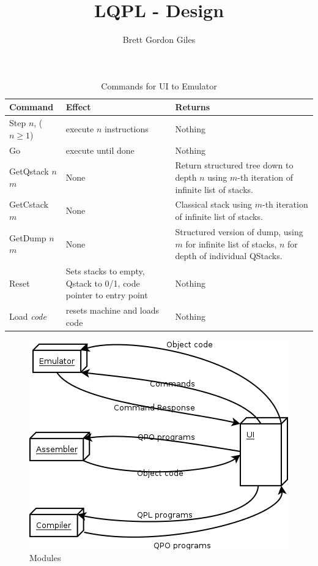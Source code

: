 \documentclass[12pt,letterpaper]{article}
\title{LQPL - Design}
\author{Brett Gordon Giles}
\begin{document}
\begin{table}[htdp]
\caption{Commands for UI to Emulator}
\begin{center}
\begin{tabular}{|p{1.5in}|p{2.1in}|p{2.1in}|}
\hline
Command&Effect &Returns \\ \hline
Step $n$, ($n\ge 1$) & execute $n$ instructions& Nothing \\ \hline
Go & execute until done &Nothing\\ \hline
GetQstack $n$ $m$ & None & Return structured tree down to depth $n$ using $m$-th iteration of infinite list of stacks.\\ \hline
GetCstack $m$ & None &Classical stack using $m$-th iteration of infinite list of stacks. \\ \hline
GetDump $n$ $m$ & None & Structured version of dump, using $m$ for infinite list of stacks, $n$ for
depth of individual QStacks. \\ \hline
Reset & Sets stacks to empty, Qstack to 0/1, code pointer to entry point & Nothing\\ \hline
Load \emph{code} & resets machine and loads code & Nothing \\
\hline
\end{tabular}
\end{center}
\label{default}
\end{table}%
\begin{figure}[htbp]
\begin{center}
\includegraphics{FourModules.png}
\caption{Modules}
\label{default}
\end{center}
\end{figure}
\end{document}
